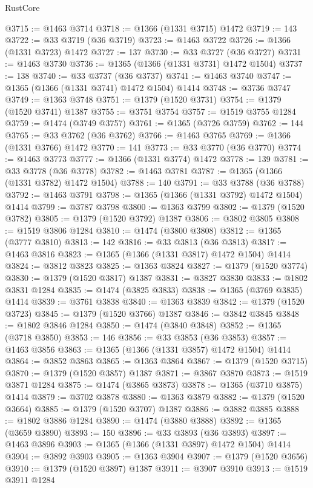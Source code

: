 \begin{lexlean}{RustCore}
\begin{coremodule}
@3715 := @1463 @3714
@3718 := @1366 (@1331 @3715) @1472
@3719 := 143
@3722 := @33 @3719 (@36 @3719)
@3723 := @1463 @3722
@3726 := @1366 (@1331 @3723) @1472
@3727 := 137
@3730 := @33 @3727 (@36 @3727)
@3731 := @1463 @3730
@3736 := @1365 (@1366 (@1331 @3731) @1472 @1504)
@3737 := 138
@3740 := @33 @3737 (@36 @3737)
@3741 := @1463 @3740
@3747 := @1365 (@1366 (@1331 @3741) @1472 @1504) @1414
@3748 := @3736 @3747
@3749 := @1363 @3748
@3751 := @1379 (@1520 @3731)
@3754 := @1379 (@1520 @3741) @1387
@3755 := @3751 @3754
@3757 := @1519 @3755 @1284
@3759 := @1474 (@3749 @3757)
@3761 := @1365 (@3726 @3759)
@3762 := 144
@3765 := @33 @3762 (@36 @3762)
@3766 := @1463 @3765
@3769 := @1366 (@1331 @3766) @1472
@3770 := 141
@3773 := @33 @3770 (@36 @3770)
@3774 := @1463 @3773
@3777 := @1366 (@1331 @3774) @1472
@3778 := 139
@3781 := @33 @3778 (@36 @3778)
@3782 := @1463 @3781
@3787 := @1365 (@1366 (@1331 @3782) @1472 @1504)
@3788 := 140
@3791 := @33 @3788 (@36 @3788)
@3792 := @1463 @3791
@3798 := @1365 (@1366 (@1331 @3792) @1472 @1504) @1414
@3799 := @3787 @3798
@3800 := @1363 @3799
@3802 := @1379 (@1520 @3782)
@3805 := @1379 (@1520 @3792) @1387
@3806 := @3802 @3805
@3808 := @1519 @3806 @1284
@3810 := @1474 (@3800 @3808)
@3812 := @1365 (@3777 @3810)
@3813 := 142
@3816 := @33 @3813 (@36 @3813)
@3817 := @1463 @3816
@3823 := @1365 (@1366 (@1331 @3817) @1472 @1504) @1414
@3824 := @3812 @3823
@3825 := @1363 @3824
@3827 := @1379 (@1520 @3774)
@3830 := @1379 (@1520 @3817) @1387
@3831 := @3827 @3830
@3833 := @1802 @3831 @1284
@3835 := @1474 (@3825 @3833)
@3838 := @1365 (@3769 @3835) @1414
@3839 := @3761 @3838
@3840 := @1363 @3839
@3842 := @1379 (@1520 @3723)
@3845 := @1379 (@1520 @3766) @1387
@3846 := @3842 @3845
@3848 := @1802 @3846 @1284
@3850 := @1474 (@3840 @3848)
@3852 := @1365 (@3718 @3850)
@3853 := 146
@3856 := @33 @3853 (@36 @3853)
@3857 := @1463 @3856
@3863 := @1365 (@1366 (@1331 @3857) @1472 @1504) @1414
@3864 := @3852 @3863
@3865 := @1363 @3864
@3867 := @1379 (@1520 @3715)
@3870 := @1379 (@1520 @3857) @1387
@3871 := @3867 @3870
@3873 := @1519 @3871 @1284
@3875 := @1474 (@3865 @3873)
@3878 := @1365 (@3710 @3875) @1414
@3879 := @3702 @3878
@3880 := @1363 @3879
@3882 := @1379 (@1520 @3664)
@3885 := @1379 (@1520 @3707) @1387
@3886 := @3882 @3885
@3888 := @1802 @3886 @1284
@3890 := @1474 (@3880 @3888)
@3892 := @1365 (@3659 @3890)
@3893 := 150
@3896 := @33 @3893 (@36 @3893)
@3897 := @1463 @3896
@3903 := @1365 (@1366 (@1331 @3897) @1472 @1504) @1414
@3904 := @3892 @3903
@3905 := @1363 @3904
@3907 := @1379 (@1520 @3656)
@3910 := @1379 (@1520 @3897) @1387
@3911 := @3907 @3910
@3913 := @1519 @3911 @1284

\end{coremodule}
\end{lexlean}
